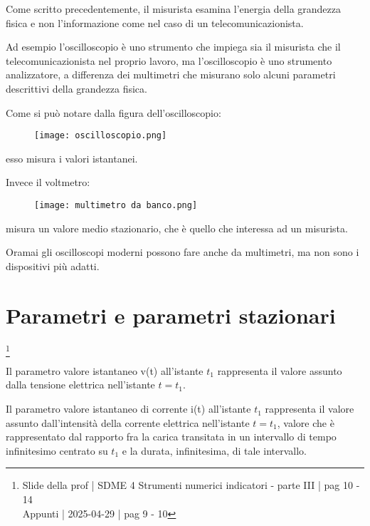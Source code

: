 Come scritto precedentemente, il misurista esamina l'energia della grandezza fisica e non l'informazione come nel 
caso di un telecomunicazionista. \newline 

Ad esempio l'oscilloscopio è uno strumento che impiega sia il misurista che il telecomunicazionista nel proprio lavoro, 
ma l'oscilloscopio è uno strumento analizzatore, a differenza dei multimetri che misurano solo alcuni parametri descrittivi della grandezza fisica. \newline 

Come si può notare dalla figura dell'oscilloscopio: 

\begin{figure}[h]
    \centering
    \texttt{[image: oscilloscopio.png]}
\end{figure}

esso misura i valori istantanei. \newline 

Invece il voltmetro: 

\begin{figure}[h]
    \centering
    \texttt{[image: multimetro da banco.png]}
\end{figure}

misura un valore medio stazionario, che è quello che interessa ad un misurista. \newline 


Oramai gli oscilloscopi moderni possono fare anche da multimetri, ma non sono i dispositivi più adatti. \newline 

\newpage 

\section{Parametri e parametri stazionari}
\footnote{Slide della prof | SDME 4 Strumenti numerici indicatori - parte III | pag  10 - 14\\  
Appunti | 2025-04-29 | pag 9 - 10}

Il parametro valore istantaneo v(t) all'istante $t_1$ 
rappresenta il valore assunto dalla tensione elettrica nell'istante $t = t_1$. \newline 

Il parametro valore istantaneo di corrente i(t) all'istante $t_1$ rappresenta 
il valore assunto dall'intensità della corrente elettrica nell'istante $t = t_1$, 
valore che è rappresentato dal rapporto fra la carica transitata in un intervallo di tempo infinitesimo centrato su $t_1$ 
e la durata, infinitesima, di tale intervallo. \newline 

